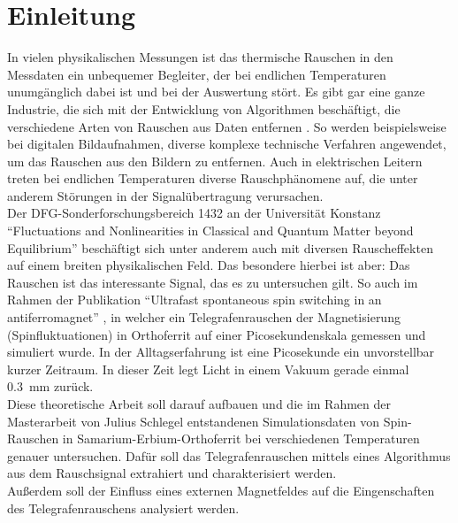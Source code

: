 \documentclass[main.tex]{subfiles}
\begin{document}
\section{Einleitung}


In vielen physikalischen Messungen ist das thermische Rauschen in den Messdaten ein unbequemer Begleiter, der bei endlichen Temperaturen unumgänglich dabei ist und bei der Auswertung stört. 
Es gibt gar eine ganze Industrie, die sich mit der Entwicklung von Algorithmen beschäftigt, die verschiedene Arten von Rauschen aus Daten entfernen \cite{digital-noise-reduction}. So werden beispielsweise bei digitalen Bildaufnahmen, diverse komplexe technische Verfahren angewendet, um das Rauschen aus den Bildern zu entfernen. Auch in elektrischen Leitern treten bei endlichen Temperaturen diverse Rauschphänomene auf, die unter anderem Störungen in der Signalübertragung verursachen.\\ 

Der DFG-Sonderforschungsbereich 1432 an der Universität Konstanz \enquote{Fluctuations and Nonlinearities in Classical and Quantum Matter beyond Equilibrium} \cite{sfb-1432} beschäftigt sich unter anderem auch mit diversen Rauscheffekten auf einem breiten physikalischen Feld.
Das besondere hierbei ist aber: Das Rauschen ist das interessante Signal, das es zu untersuchen gilt. So auch im Rahmen der Publikation \enquote{Ultrafast spontaneous spin switching in an antiferromagnet} \cite{weiss-ultrafast}, in welcher ein Telegrafenrauschen der Magnetisierung (Spinfluktuationen) in Orthoferrit auf einer Picosekundenskala gemessen und simuliert wurde. In der Alltagserfahrung ist eine Picosekunde ein unvorstellbar kurzer Zeitraum. In dieser Zeit legt Licht in einem Vakuum gerade einmal \SI{0.3}{\milli\meter} zurück.\\

Diese theoretische Arbeit soll darauf aufbauen und die im Rahmen der Masterarbeit von Julius Schlegel \cite{schlegel-master} entstandenen Simulationsdaten von Spin-Rauschen in Samarium-Erbium-Orthoferrit bei verschiedenen Temperaturen genauer untersuchen. Dafür soll das Telegrafenrauschen mittels eines Algorithmus aus dem Rauschsignal extrahiert und charakterisiert werden.\\
Außerdem soll der Einfluss eines externen Magnetfeldes auf die Eingenschaften des Telegrafenrauschens analysiert werden.\\
\end{document}
